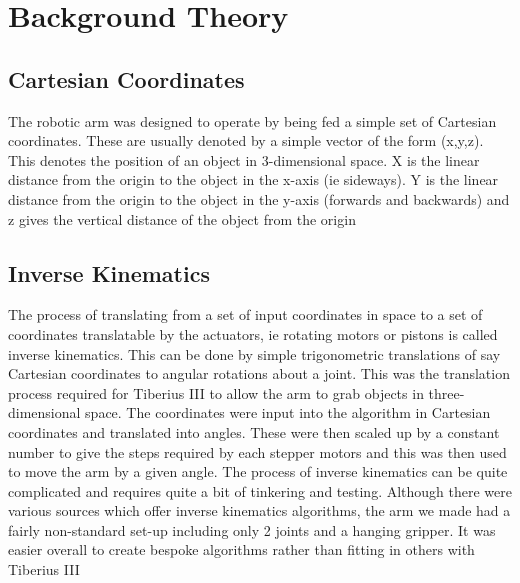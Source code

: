 \section{Background Theory}
\subsection{Cartesian Coordinates}
The robotic arm was designed to operate by being fed a simple set of Cartesian coordinates.  These are usually denoted by a simple vector of the form (x,y,z).  This denotes the position of an object in 3-dimensional space.  X is the linear distance from the origin to the object in the x-axis (ie sideways).  Y is the linear distance from the origin to the object in the y-axis (forwards and backwards) and z gives the vertical distance of the object from the origin


\subsection{Inverse Kinematics}
The process of translating from a set of input coordinates in space to a set of coordinates translatable by the actuators, ie rotating motors or pistons is called inverse kinematics.  This can be done by simple trigonometric translations of say Cartesian coordinates to angular rotations about a joint.  
This was the translation process required for Tiberius III to allow the arm to grab objects in three-dimensional space.  The coordinates were input into the algorithm in Cartesian coordinates and translated into angles.  These were then scaled up by a constant number to give the steps required by each stepper motors and this was then used to move the arm by a given angle.  The process of inverse kinematics can be quite complicated and requires quite a  bit of tinkering and testing.
Although there were various sources which offer inverse kinematics algorithms, the arm we made had a fairly non-standard set-up including only 2 joints and a hanging gripper.  It was easier overall to create bespoke algorithms rather than fitting in others with Tiberius III